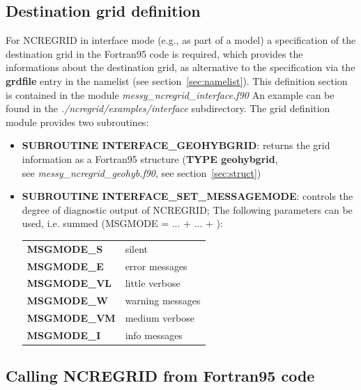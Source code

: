 \documentclass[12pt, a4paper]{article}
\begin{document}
\subsection{Destination grid definition}
\label{sec:defineinterface}
For NCREGRID in interface mode (e.g., as part of a model)
a specification of the destination grid in the Fortran95 code is required,
which provides the informations about the destination grid,
as alternative to the specification via the {\bf grdfile} entry in the
namelist (see section~\ref{sec:namelist}). 
%
This definition section is contained
in the module {\it messy\_ncregrid\_interface.f90}
An example can be found in the
{\it ./ncregrid/examples/interface} subdirectory.
%
The grid definition module provides two subroutines:
\begin{itemize}
\item {\bf SUBROUTINE INTERFACE\_GEOHYBGRID}:
      returns the grid information as a Fortran95 structure
      ({\bf TYPE geohybgrid}, \\
      see {\it messy\_ncregrid\_geohyb.f90},
      see section~\ref{sec:struct})
\item {\bf SUBROUTINE INTERFACE\_SET\_MESSAGEMODE}:
      controls the degree of diagnostic output of NCREGRID;
      The following parameters can be used, i.e. summed
      (MSGMODE = ... + ... + ):
        \begin{tabular}{ll}
          {\bf MSGMODE\_S}  & silent\\
          {\bf MSGMODE\_E}  & error messages\\
          {\bf MSGMODE\_VL} & little verbose\\
          {\bf MSGMODE\_W}  & warning messages\\
          {\bf MSGMODE\_VM} & medium verbose\\
          {\bf MSGMODE\_I}  & info messages\\
        \end{tabular}
\end{itemize}

\subsection{Calling NCREGRID from Fortran95 code}
\label{sec:startinterface}
%
\end{document}
